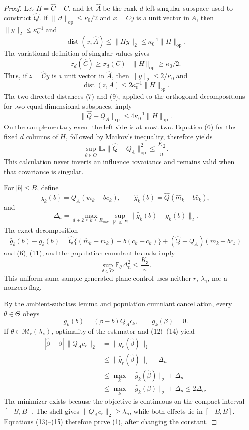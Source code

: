 \documentclass{article}
\begin{document}
\begin{proof}
Let \(H=\widehat C-C\), and let \(\widehat A\) be the rank-\(d\) left singular subspace used to construct \(\widehat Q\).  If \(\|H\|_{\mathrm{op}}\leq\kappa_0/2\) and \(x=Cy\) is a unit vector in \(A\), then \(\|y\|_2\leq\kappa_0^{-1}\) and
\[
 \operatorname{dist}(x,\widehat A)
 \leq\|Hy\|_2\leq\kappa_0^{-1}\|H\|_{\mathrm{op}}.                    \tag{7}
\]
The variational definition of singular values gives
\[
 \sigma_d(\widehat C)\geq\sigma_d(C)-\|H\|_{\mathrm{op}}
 \geq\kappa_0/2.                                                          \tag{8}
\]
Thus, if \(z=\widehat Cy\) is a unit vector in \(\widehat A\), then \(\|y\|_2\leq2/\kappa_0\) and
\[
 \operatorname{dist}(z,A)\leq2\kappa_0^{-1}\|H\|_{\mathrm{op}}.         \tag{9}
\]
The two directed distances (7) and (9), applied to the orthogonal decompositions for two equal-dimensional subspaces, imply
\[
 \|\widehat Q-Q_A\|_{\mathrm{op}}
 \leq4\kappa_0^{-1}\|H\|_{\mathrm{op}}.                                \tag{10}
\]
On the complementary event the left side is at most two.  Equation (6) for the fixed \(d\) columns of \(H\), followed by Markov's inequality, therefore yields
\[
 \sup_{\theta\in\Theta}
 \mathbb E_\theta\|\widehat Q-Q_A\|_{\mathrm{op}}^2\leq\frac{K_2}{n}. \tag{11}
\]
This calculation never inverts an influence covariance and remains valid when that covariance is singular.

For \(|b|\leq B\), define
\[
 g_k(b)=Q_A(m_k-bc_k),
 \qquad \widehat g_k(b)=\widehat Q(\widehat m_k-b\widehat c_k),
\]
and
\[
 \Delta_n=\max_{d+2\leq k\leq R_{\max}}
 \sup_{|b|\leq B}\|\widehat g_k(b)-g_k(b)\|_2.
\]
The exact decomposition
\[
 \widehat g_k(b)-g_k(b)
 =\widehat Q\{(\widehat m_k-m_k)-b(\widehat c_k-c_k)\}
  +(\widehat Q-Q_A)(m_k-bc_k)                                             \tag{12}
\]
and (6), (11), and the population cumulant bounds imply
\[
 \sup_{\theta\in\Theta}\mathbb E_\theta\Delta_n^2\leq\frac{K_3}{n}.    \tag{13}
\]
This uniform same-sample generated-plane control uses neither \(r\), \(\lambda_n\), nor a nonzero flag.

By the ambient-subclass lemma and population cumulant cancellation, every \(\theta\in\Theta\) obeys
\[
 g_k(b)=(\beta-b)Q_Ac_k,
 \qquad g_k(\beta)=0.                                                      \tag{14}
\]
If \(\theta\in\mathcal M_r(\lambda_n)\), optimality of the estimator and (12)--(14) yield
\[
 \begin{aligned}
 |\widehat\beta-\beta|\,\|Q_Ac_r\|_2
 &=\|g_r(\widehat\beta)\|_2\\
 &\leq\|\widehat g_r(\widehat\beta)\|_2+\Delta_n\\
 &\leq\max_k\|\widehat g_k(\widehat\beta)\|_2+\Delta_n\\
 &\leq\max_k\|\widehat g_k(\beta)\|_2+\Delta_n
 \leq2\Delta_n.
 \end{aligned}                                                            \tag{15}
\]
The minimizer exists because the objective is continuous on the compact interval \([-B,B]\).  The shell gives \(\|Q_Ac_r\|_2\geq\lambda_n\), while both effects lie in \([-B,B]\).  Equations (13)--(15) therefore prove (1), after changing the constant.


\end{proof}
\end{document}
